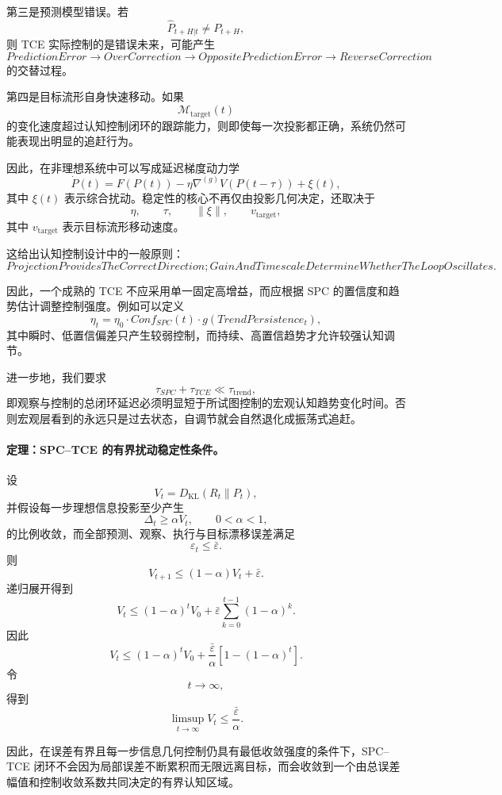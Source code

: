 第三是预测模型错误。若
\[
\widehat P_{t+H|t}
\neq
P_{t+H},
\]
则 TCE 实际控制的是错误未来，可能产生
\[
PredictionError
\rightarrow
OverCorrection
\rightarrow
OppositePredictionError
\rightarrow
ReverseCorrection
\]
的交替过程。

第四是目标流形自身快速移动。如果
\[
\mathcal{M}_{\mathrm{target}}(t)
\]
的变化速度超过认知控制闭环的跟踪能力，则即使每一次投影都正确，系统仍然可能表现出明显的追赶行为。

因此，在非理想系统中可以写成延迟梯度动力学
\[
\dot P(t)
=
F(P(t))
-
\eta
\nabla^{(g)}
V
\left(
P(t-\tau)
\right)
+
\xi(t),
\]
其中 $\xi(t)$ 表示综合扰动。稳定性的核心不再仅由投影几何决定，还取决于
\[
\eta,
\qquad
\tau,
\qquad
\|\xi\|,
\qquad
v_{\mathrm{target}},
\]
其中 $v_{\mathrm{target}}$ 表示目标流形移动速度。

这给出认知控制设计中的一般原则：
\[
\boxed{
ProjectionProvidesTheCorrectDirection;
GainAndTimescaleDetermineWhetherTheLoopOscillates.
}
\]

因此，一个成熟的 TCE 不应采用单一固定高增益，而应根据 SPC 的置信度和趋势估计调整控制强度。例如可以定义
\[
\eta_t
=
\eta_0
\cdot
Conf_{SPC}(t)
\cdot
g
\left(
TrendPersistence_t
\right),
\]
其中瞬时、低置信偏差只产生较弱控制，而持续、高置信趋势才允许较强认知调节。

进一步地，我们要求
\[
\tau_{SPC}+\tau_{TCE}
\ll
\tau_{\mathrm{trend}},
\]
即观察与控制的总闭环延迟必须明显短于所试图控制的宏观认知趋势变化时间。否则宏观层看到的永远只是过去状态，自调节就会自然退化成振荡式追赶。

\paragraph{定理：SPC--TCE 的有界扰动稳定性条件。}

设
\[
V_t
=
D_{\mathrm{KL}}
\left(
R_t\|P_t
\right),
\]
并假设每一步理想信息投影至少产生
\[
\Delta_t\ge \alpha V_t,
\qquad
0<\alpha<1,
\]
的比例收敛，而全部预测、观察、执行与目标漂移误差满足
\[
\varepsilon_t\le\bar\varepsilon.
\]
则
\[
V_{t+1}
\le
(1-\alpha)V_t
+
\bar\varepsilon.
\]
递归展开得到
\[
V_t
\le
(1-\alpha)^tV_0
+
\bar\varepsilon
\sum_{k=0}^{t-1}
(1-\alpha)^k.
\]
因此
\[
V_t
\le
(1-\alpha)^tV_0
+
\frac{\bar\varepsilon}{\alpha}
\left[
1-(1-\alpha)^t
\right].
\]
令
\[
t\rightarrow\infty,
\]
得到
\[
\boxed{
\limsup_{t\rightarrow\infty}
V_t
\le
\frac{\bar\varepsilon}{\alpha}.
}
\label{eq:spc-tce-practical-stability}
\]

因此，在误差有界且每一步信息几何控制仍具有最低收敛强度的条件下，SPC--TCE 闭环不会因为局部误差不断累积而无限远离目标，而会收敛到一个由总误差幅值和控制收敛系数共同决定的有界认知区域。

